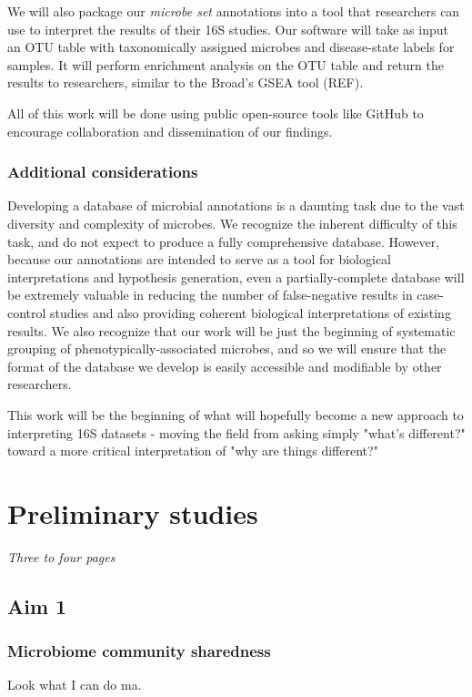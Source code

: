 \documentclass[12pt]{article}
\begin{document}
We will also package our \textit{microbe set} annotations into a tool that researchers can use to interpret the results of their 16S studies. Our software will take as input an OTU table with taxonomically assigned microbes and disease-state labels for samples. It will perform enrichment analysis on the OTU table and return the results to researchers, similar to the Broad's GSEA tool (REF).

All of this work will be done using public open-source tools like GitHub to encourage collaboration and dissemination of our findings.

\subsubsection{Additional considerations}
Developing a database of microbial annotations is a daunting task due to the vast diversity and complexity of microbes. We recognize the inherent difficulty of this task, and do not expect to produce a fully comprehensive database. However, because our annotations are intended to serve as a tool for biological interpretations and hypothesis generation, even a partially-complete database will be extremely valuable in reducing the number of false-negative results in case-control studies and also providing coherent biological interpretations of existing results. We also recognize that our work will be just the beginning of systematic grouping of phenotypically-associated microbes, and so we will ensure that the format of the database we develop is easily accessible and modifiable by other researchers.

This work will be the beginning of what will hopefully become a new approach to interpreting 16S datasets - moving the field from asking simply "what's different?" toward a more critical interpretation of "why are things different?"

\section{Preliminary studies}
\textit{Three to four pages}

\subsection{Aim 1}
\subsubsection{Microbiome community sharedness}
Look what I can do ma.
\end{document}
